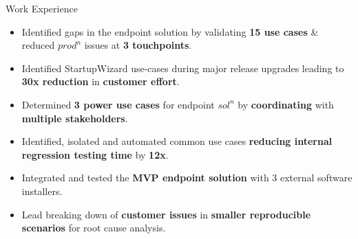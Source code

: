 \documentclass{resume}
\newcommand{\sepval}{-0.5em}
\begin{document}
\begin{rSection}{Work Experience}
\begin{itemize}[leftmargin=*]

	\itemsep \sepval

	\item Identified gaps in the endpoint solution by validating {\bf 15 use cases} \& reduced $prod^{n}$ issues at {\bf 3 touchpoints}.

	\item Identified StartupWizard use-cases during major release upgrades leading to {\bf 30x reduction} in {\bf customer effort}.

	\item Determined {\bf 3 power use cases} for endpoint $sol^{n}$ by {\bf coordinating} with {\bf multiple stakeholders}.

	\item Identified, isolated and automated common use cases {\bf reducing internal regression testing time} by {\bf 12x}.
	
	\item Integrated and tested the {\bf MVP endpoint solution} with 3 external software installers.

	\item Lead breaking down of {\bf customer issues} in {\bf smaller reproducible scenarios} for root cause analysis.

\end{itemize}

\end{rSection}

\end{document}

